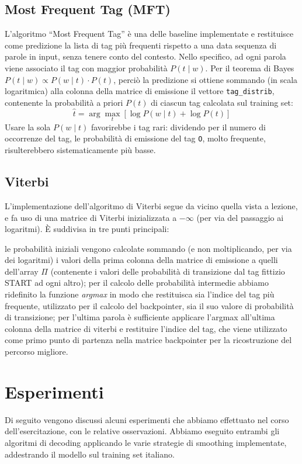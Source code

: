 \documentclass[a4paper,11pt,notitlepage]{report}
\begin{document}
\section{Most Frequent Tag (MFT)}
L'algoritmo ``Most Frequent Tag'' è una delle baseline implementate e restituisce come predizione la lista di tag più frequenti rispetto a una data sequenza di parole in input, senza tenere conto del contesto. Nello specifico, ad ogni parola viene associato il tag con maggior probabilità $P(t \mid w)$. Per il teorema di Bayes $P(t \mid w) \propto P(w \mid t) \cdot P(t)$, perciò la predizione si ottiene sommando (in scala logaritmica) alla colonna della matrice di emissione il vettore \texttt{tag\_distrib}, contenente la probabilità a priori $P(t)$ di ciascun tag calcolata sul training set:
\[
\hat{t} = \arg\max_{t} \left[ \log P(w \mid t) + \log P(t) \right]
\]
Usare la sola $P(w \mid t)$ favorirebbe i tag rari: dividendo per il numero di occorrenze del tag, le probabilità di emissione del tag \texttt{O}, molto frequente, risulterebbero sistematicamente più basse.

\section{Viterbi}
L'implementazione dell'algoritmo di Viterbi segue da vicino quella vista a lezione, e fa uso di una matrice di Viterbi inizializzata a $-\infty$ (per via del passaggio ai logaritmi). È suddivisa in tre punti principali:
\begin{outline}[enumerate]
    \1 le probabilità iniziali vengono calcolate sommando (e non moltiplicando, per via dei logaritmi) i valori della prima colonna della matrice di emissione a quelli dell'array $\Pi$ (contenente i valori delle probabilità di transizione dal tag fittizio START ad ogni altro);
    \1 per il calcolo delle probabilità intermedie abbiamo ridefinito la funzione \textit{argmax} in modo che restituisca sia l'indice del tag più frequente, utilizzato per il calcolo del backpointer, sia il suo valore di probabilità di transizione;
    \1 per l'ultima parola è sufficiente applicare l'argmax all'ultima colonna della matrice di viterbi e restituire l'indice del tag, che viene utilizzato come primo punto di partenza nella matrice backpointer per la ricostruzione del percorso migliore.
\end{outline}


\chapter{Esperimenti}
Di seguito vengono discussi alcuni esperimenti che abbiamo effettuato nel corso dell'esercitazione, con le relative osservazioni. Abbiamo eseguito entrambi gli algoritmi di decoding applicando le varie strategie di smoothing implementate, addestrando il modello sul training set italiano.
\end{document}
